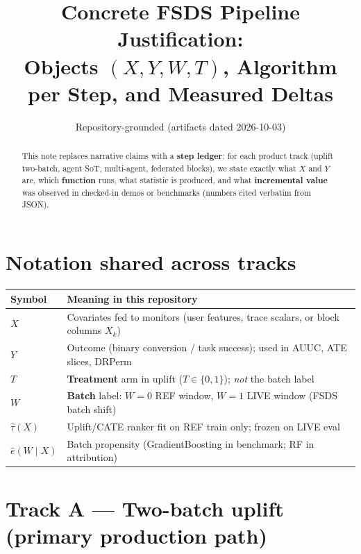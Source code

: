 \documentclass[11pt]{article}
\title{Concrete FSDS Pipeline Justification:\\
Objects $(X,Y,W,T)$, Algorithm per Step, and Measured Deltas}
\author{Repository-grounded (artifacts dated 2026-10-03)}
\date{}
\begin{document}
\maketitle

\begin{abstract}
This note replaces narrative claims with a \textbf{step ledger}: for each product track (uplift two-batch, agent SoT, multi-agent, federated blocks), we state exactly what \textbf{$X$} and \textbf{$Y$} are, which \textbf{function} runs, what statistic is produced, and what \textbf{incremental value} was observed in checked-in demos or benchmarks (numbers cited verbatim from JSON).
\end{abstract}

\section{Notation shared across tracks}
\begin{center}
\begin{tabular}{@{}ll@{}}
\toprule
Symbol & Meaning in this repository \\
\midrule
$X$ & Covariates fed to monitors (user features, trace scalars, or block columns $X_k$) \\
$Y$ & Outcome (binary conversion / task success); used in AUUC, ATE slices, DRPerm \\
$T$ & \textbf{Treatment} arm in uplift ($T\in\{0,1\}$); \emph{not} the batch label \\
$W$ & \textbf{Batch} label: $W=0$ REF window, $W=1$ LIVE window (FSDS batch shift) \\
$\hat\tau(X)$ & Uplift/CATE ranker fit on REF train only; frozen on LIVE eval \\
$\hat e(W\mid X)$ & Batch propensity (GradientBoosting in benchmark; RF in attribution) \\
\bottomrule
\end{tabular}
\end{center}

\section{Track A --- Two-batch uplift (primary production path)}
\end{document}
